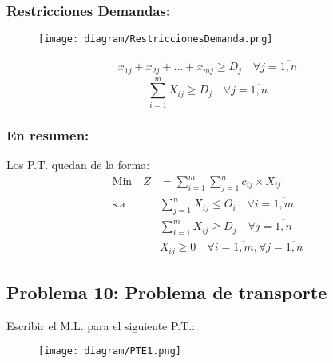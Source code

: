 \documentclass{templateNote}
\begin{document}
\subsubsection*{Restricciones Demandas:}
\begin{figure}[H]
    \centering
    \texttt{[image: diagram/RestriccionesDemanda.png]}
\end{figure}
\begin{align*}
    x_{1j} + x_{2j} + ... + x_{mj} \geq D_j \quad \forall j = \overline{1,n}
\end{align*}
\begin{equation*}
    \sum_{i=1}^{m}{X_{ij}} \geq D_j \quad \forall j = \overline{1,n}
\end{equation*}

\newpage
\subsubsection*{En resumen:}
Los P.T. quedan de la forma:
\begin{align*}
    \text{Min} \quad Z &= \sum_{i=1}^{m}{\sum_{j=1}^{n}{c_{ij} \times X_{ij}}} \\
    \text{s.a} \quad & \sum_{j=1}^{n}{X_{ij}} \leq O_i \quad \forall i = \overline{1,m} \\
    & \sum_{i=1}^{m}{X_{ij}} \geq D_j \quad \forall j = \overline{1,n} \\
    & X_{ij} \geq 0 \quad \forall i = \overline{1,m}, \forall j = \overline{1,n}
\end{align*}

\subsection*{Problema 10: Problema de transporte}
Escribir el M.L. para el siguiente P.T.:
\begin{figure}[H]
    \centering
    \texttt{[image: diagram/PTE1.png]}
\end{figure}
\end{document}
